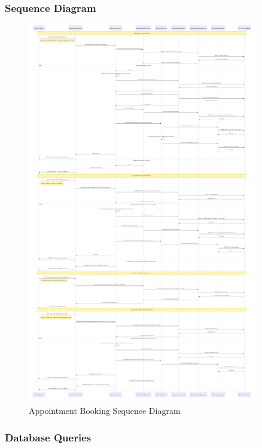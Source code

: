 \documentclass[12pt,a4paper]{article}
\begin{document}
\subsubsection{Sequence Diagram}

\begin{figure}[H]
\centering
\includegraphics[width=0.9\textwidth]{diagrams/appointment_booking_sequence.png}
\caption{Appointment Booking Sequence Diagram}
\label{fig:appointment-sequence}
\end{figure}

\subsubsection{Database Queries}
\end{document}
